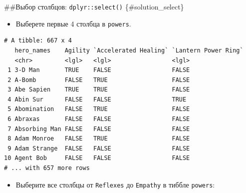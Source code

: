 \documentclass[
]{book}
\newenvironment{Shaded}{\begin{snugshade}}{\end{snugshade}}
\newcommand{\DecValTok}[1]{\textcolor[rgb]{0.00,0.00,0.81}{#1}}
\newcommand{\KeywordTok}[1]{\textcolor[rgb]{0.13,0.29,0.53}{\textbf{#1}}}
\newcommand{\NormalTok}[1]{#1}
\newcommand{\OperatorTok}[1]{\textcolor[rgb]{0.81,0.36,0.00}{\textbf{#1}}}
\newcommand{\StringTok}[1]{\textcolor[rgb]{0.31,0.60,0.02}{#1}}
\providecommand{\tightlist}{%
  \setlength{\itemsep}{0pt}\setlength{\parskip}{0pt}}
\begin{document}
\#\#Выбор столбцов: \texttt{dplyr::select()} \{\#solution\_select\}

\begin{itemize}
\tightlist
\item
  Выберете первые 4 столбца в \texttt{powers}.
\end{itemize}

\begin{Shaded}
\end{Shaded}

\begin{verbatim}
# A tibble: 667 x 4
   hero_names    Agility `Accelerated Healing` `Lantern Power Ring`
   <chr>         <lgl>   <lgl>                 <lgl>               
 1 3-D Man       TRUE    FALSE                 FALSE               
 2 A-Bomb        FALSE   TRUE                  FALSE               
 3 Abe Sapien    TRUE    TRUE                  FALSE               
 4 Abin Sur      FALSE   FALSE                 TRUE                
 5 Abomination   FALSE   TRUE                  FALSE               
 6 Abraxas       FALSE   FALSE                 FALSE               
 7 Absorbing Man FALSE   FALSE                 FALSE               
 8 Adam Monroe   FALSE   TRUE                  FALSE               
 9 Adam Strange  FALSE   FALSE                 FALSE               
10 Agent Bob     FALSE   FALSE                 FALSE               
# ... with 657 more rows
\end{verbatim}

\begin{itemize}
\tightlist
\item
  Выберите все столбцы от \texttt{Reflexes} до \texttt{Empathy} в тиббле \texttt{powers}:
\end{itemize}

\begin{Shaded}
\end{Shaded}
\end{document}
